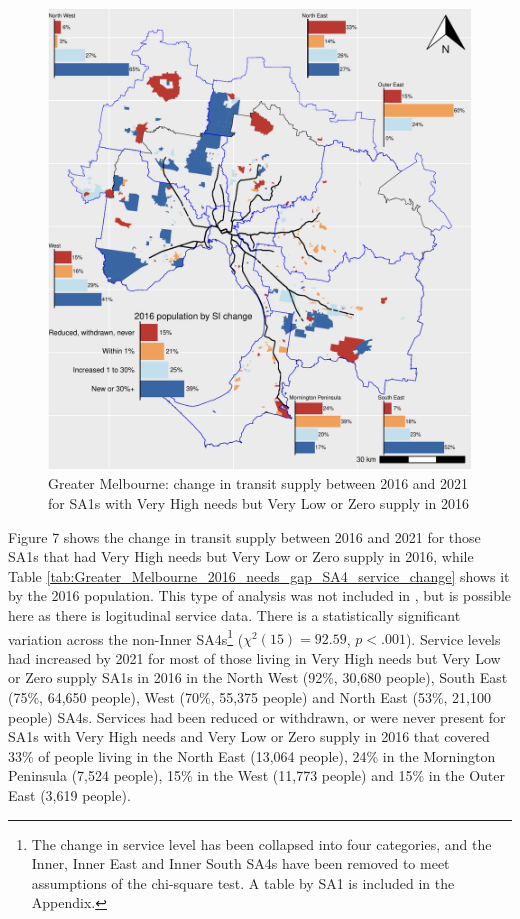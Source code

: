\documentclass[preprint, 3p,
authoryear]{elsarticle} %
\begin{document}
\begin{figure}
\centering
\includegraphics{ReynoldsCurrieQu2024_files/figure-latex/Greater_Melbourne_2016_needs_gap_SA4_service_change-1.pdf}
\caption{Greater Melbourne: change in transit supply between 2016 and
2021 for SA1s with Very High needs but Very Low or Zero supply in 2016}
\end{figure}

Figure 7 shows the change in transit supply between 2016 and 2021 for
those SA1s that had Very High needs but Very Low or Zero supply in 2016,
while Table
\ref{tab:Greater_Melbourne_2016_needs_gap_SA4_service_change} shows it
by the 2016 population. This type of analysis was not included in
\citet{currie2010identifying}, but is possible here as there is
logitudinal service data. There is a statistically significant variation
across the non-Inner SA4s\footnote{The change in service level has been
  collapsed into four categories, and the Inner, Inner East and Inner
  South SA4s have been removed to meet assumptions of the chi-square
  test. A table by SA1 is included in the Appendix.}
(\(\chi^2(15) = 92.59\), \(p < .001\)). Service levels had increased by
2021 for most of those living in Very High needs but Very Low or Zero
supply SA1s in 2016 in the North West (92\%, 30,680 people), South East
(75\%, 64,650 people), West (70\%, 55,375 people) and North East (53\%,
21,100 people) SA4s. Services had been reduced or withdrawn, or were
never present for SA1s with Very High needs and Very Low or Zero supply
in 2016 that covered 33\% of people living in the North East (13,064
people), 24\% in the Mornington Peninsula (7,524 people), 15\% in the
West (11,773 people) and 15\% in the Outer East (3,619 people).
\end{document}
